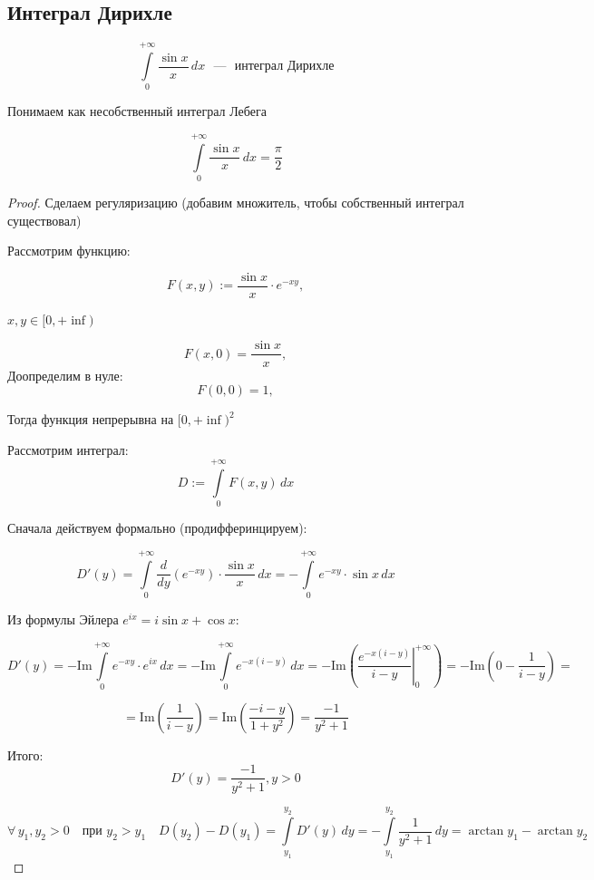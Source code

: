 \subsection{Интеграл Дирихле}

\[
    \int\limits_0^{+\infty} \frac{\sin x}{x} \, dx \text{ ~---~ интеграл Дирихле}
\]

\begin{note}
Понимаем как несобственный интеграл Лебега
\end{note}

\begin{theorem}
\[
    \int\limits_0^{+\infty} \frac{\sin x}{x} \, dx = \frac{\pi}{2}
\]

\end{theorem}

\begin{proof}

\noindent

Сделаем регуляризацию (добавим множитель, чтобы собственный интеграл существовал)

Рассмотрим функцию:

\[
F(x, y) := \frac{\sin x}{x} \cdot e^{-x y},
\]

$x, y \in [0, +\inf)$

\[
F(x, 0) = \frac{\sin x}{x},
\]
Доопределим в нуле:
\[
F(0, 0) = 1,  
\]

Тогда функция непрерывна на $[0, +\inf) ^2$

Рассмотрим интеграл:
\[
D := \int\limits_0^{+\infty}F(x, y) \,d x
\]

Сначала действуем формально (продифферинцируем):

\[
    D'(y) = \int\limits_0^{+\infty} \frac{d}{dy} \left( e^{-x y} \right) \cdot \frac{\sin x}{x} \, dx = - \int\limits_0^{+\infty} e^{-x y} \cdot \sin x \, dx
\]

Из формулы Эйлера $e^{ix} = i \sin x + \cos x$:

\[
D'(y) = -\mathrm{Im} \int\limits_0^{+\infty} e^{-xy} \cdot e^{ix} \, dx
= -\mathrm{Im} \int\limits_0^{+\infty} e^{-x(i - y)}\, dx
= -\mathrm{Im} \left( \left. \frac{e^{-x(i - y)}}{i - y} \right|_0^{+\infty} \right) = -\mathrm{Im}\left( 0 - \frac{1}{i-y}\right) =
\]

\[
= \mathrm{Im} \left( \frac{1}{i - y} \right) = \mathrm{Im} \left( \frac{-i - y}{1 + y^2} \right)
= \frac{-1}{y^2 + 1}
\] 

Итого:
\[
D'(y) = \frac{-1}{y^2 + 1}, y > 0
\]

\[
\forall\, y_1, y_2 > 0 \quad \text{при } y_2 > y_1 \quad
D(y_2) - D(y_1) = \int\limits_{y_1}^{y_2} D'(y) \, dy
= - \int\limits_{y_1}^{y_2} \frac{1}{y^2 + 1} \, dy = \arctan{y_1} - \arctan{y_2}
\]


\end{proof}
